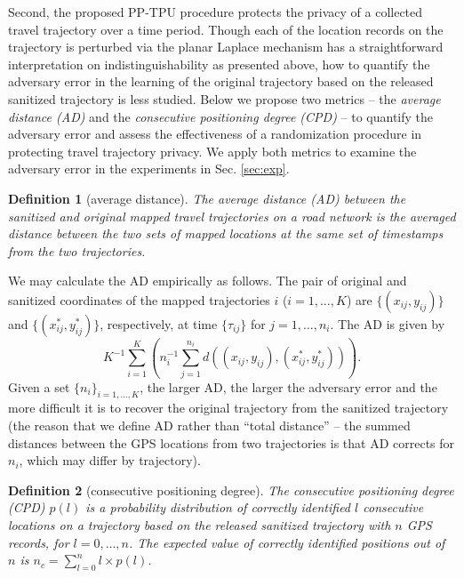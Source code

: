 \documentclass[10pt,journal,compsoc]{IEEEtran}
\newtheorem{defn}{Definition}
\begin{document}
Second, the proposed PP-TPU procedure protects the privacy of a collected travel trajectory over a time period. Though each of the location records  on the trajectory is perturbed via the planar Laplace mechanism has a straightforward interpretation on indistinguishability as presented above, how to quantify the adversary error in the learning of the original trajectory based on the released sanitized trajectory is less studied. Below we propose two metrics --  the \emph{ average distance (AD)} and  the \emph{consecutive positioning degree (CPD)} -- to quantify the adversary error and assess the effectiveness of a randomization procedure in protecting travel trajectory privacy.  We apply both metrics to examine the adversary error in the experiments in Sec. \ref{sec:exp}.
\begin{defn}[average distance]\label{def:etd}
The average distance (AD) between the sanitized and  original mapped travel trajectories on a  road network is the averaged distance between the two sets of mapped locations at the same set of timestamps from the two trajectories.
\end{defn}
We may calculate the AD empirically as follows. The pair of original and sanitized coordinates of the mapped trajectories $i$ ($i=1,\ldots,K$) are $\{(x_{ij},y_{ij})\}$  and  $\{(x^*_{ij},y^*_{ij})\}$, respectively, at time $\{\tau_{ij}\}$ for $j=1,\ldots,n_i$. The AD is given by
\begin{equation}\label{eqn:AD}
\textstyle K^{-1}\sum_{i=1}^K\left(n_i^{-1}\sum_{j=1}^{n_i}  d((x_{ij},y_{ij}), (x^*_{ij},y^*_{ij}))\right).
\end{equation}
Given a set $\{n_i\}_{i=1,\ldots,K}$, the larger AD, the larger the adversary error and the more difficult it is to recover the original trajectory from the sanitized trajectory (the reason that we define AD rather than ``total distance'' -- the summed distances between the GPS locations from two trajectories is that AD corrects for $n_i$, which may differ by trajectory).

\begin{defn}[consecutive positioning degree]\label{def:CPD}
The consecutive positioning degree (CPD) $p(l)$ is a probability  distribution  of correctly identified $l$ consecutive locations on a trajectory based on the released sanitized trajectory with $n$ GPS records, for $l=0,\ldots,n$. The expected value of correctly identified positions out of $n$ is $n_c=\sum_{l=0}^n l\times p(l)$.
\end{defn}
\end{document}
